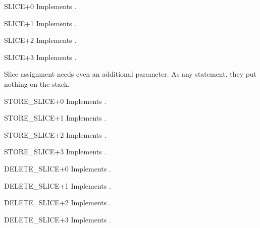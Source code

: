 \begin{opcodedesc}{SLICE+0}{}
Implements .
\end{opcodedesc}

\begin{opcodedesc}{SLICE+1}{}
Implements .
\end{opcodedesc}

\begin{opcodedesc}{SLICE+2}{}
Implements .
\end{opcodedesc}

\begin{opcodedesc}{SLICE+3}{}
Implements .
\end{opcodedesc}

Slice assignment needs even an additional parameter.  As any statement,
they put nothing on the stack.

\begin{opcodedesc}{STORE_SLICE+0}{}
Implements .
\end{opcodedesc}

\begin{opcodedesc}{STORE_SLICE+1}{}
Implements .
\end{opcodedesc}

\begin{opcodedesc}{STORE_SLICE+2}{}
Implements .
\end{opcodedesc}

\begin{opcodedesc}{STORE_SLICE+3}{}
Implements .
\end{opcodedesc}

\begin{opcodedesc}{DELETE_SLICE+0}{}
Implements .
\end{opcodedesc}

\begin{opcodedesc}{DELETE_SLICE+1}{}
Implements .
\end{opcodedesc}

\begin{opcodedesc}{DELETE_SLICE+2}{}
Implements .
\end{opcodedesc}

\begin{opcodedesc}{DELETE_SLICE+3}{}
Implements .
\end{opcodedesc}

